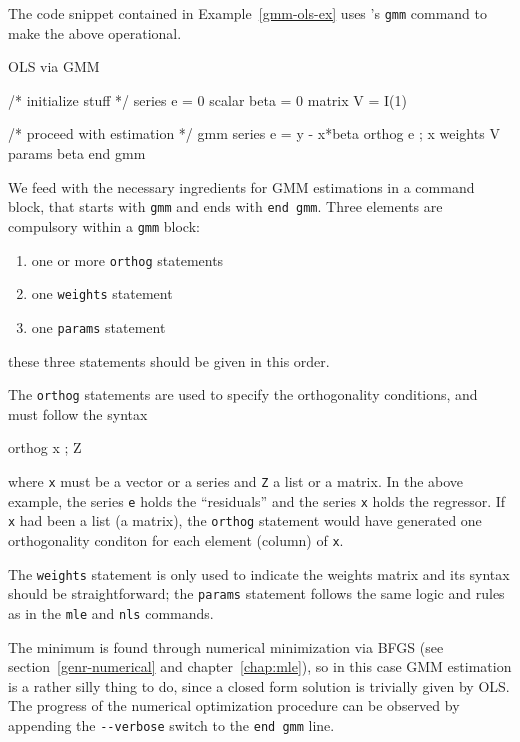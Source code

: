 The code snippet contained in Example~\ref{gmm-ols-ex} uses
's \texttt{gmm} command to make the above operational.

\begin{script}[htbp]
  \caption{OLS via GMM}
  \label{gmm-ols-ex}
\begin{code}
/* initialize stuff */
series e = 0
scalar beta = 0
matrix V = I(1)

/* proceed with estimation */
gmm 
  series e = y - x*beta
  orthog e ; x
  weights V
  params beta
end gmm
\end{code}
\end{script}

We feed  with the necessary ingredients for GMM estimations
in a command block, that starts with \texttt{gmm} and ends with
\texttt{end gmm}. Three elements are compulsory within a \texttt{gmm}
block:
\begin{enumerate}
\item one or more \texttt{orthog} statements
\item one \texttt{weights} statement
\item one \texttt{params} statement
\end{enumerate}
these three statements should be given in this order.

The \texttt{orthog} statements are used to specify the orthogonality
conditions, and must follow the syntax
\begin{code}
  orthog x ; Z
\end{code}
where \texttt{x} must be a vector or a series and \texttt{Z} a list or
a matrix. In the above example, the series \texttt{e} holds the
``residuals'' and the series \texttt{x} holds the regressor. If
\texttt{x} had been a list (a matrix), the \texttt{orthog} statement would have
generated one orthogonality conditon for each element (column) of \texttt{x}.

The \texttt{weights} statement is only used to indicate the weights
matrix and its syntax should be straightforward; the \texttt{params}
statement follows the same logic and rules as in the \texttt{mle} and
\texttt{nls} commands.

The minimum is found through numerical minimization via BFGS (see
section~\ref{genr-numerical} and chapter~\ref{chap:mle}), so in this
case GMM estimation is a rather silly thing to do, since a closed form
solution is trivially given by OLS. The progress of the numerical
optimization procedure can be observed by appending the
\verb|--verbose| switch to the \texttt{end gmm} line.

